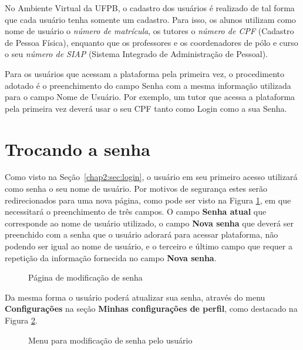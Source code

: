 No Ambiente Virtual da UFPB, o cadastro dos usuários é realizado de tal forma que cada usuário tenha somente 
um cadastro. Para isso, os alunos utilizam como nome de usuário o \emph{número de matrícula}, os tutores o \emph{número de CPF} (Cadastro de Pessoa Física), enquanto que os professores e os coordenadores de pólo e curso o seu \emph{número de SIAP} (Sistema Integrado de Administração de Pessoal).

Para os usuários que acessam a plataforma pela primeira vez, o procedimento adotado é o preenchimento do campo Senha com a mesma informação utilizada para o campo Nome de Usuário. Por exemplo, um tutor que acessa a plataforma pela primeira vez deverá 
usar o seu CPF tanto como Login como a sua Senha.
\section{Trocando a senha}
\label{chap2:sec:trocando}
Como visto na Seção~\ref{chap2:sec:login}, o usuário em seu primeiro acesso utilizará como senha o seu nome de usuário. Por motivos de segurança estes serão redirecionados para uma nova página, como pode ser visto na Figura \ref{fig:modifica senha}, em que necessitará o preenchimento de três campos. O campo \textbf{Senha atual} que corresponde ao nome de usuário utilizado, o campo \textbf{Nova senha} que deverá ser preenchido com a senha que o usuário adorará para acessar plataforma, não podendo ser igual ao nome de usuário, e o terceiro e último campo que requer a repetição da informação fornecida no campo \textbf{Nova senha}.

\begin{figure}[htbp]
 \begin{center}
  \caption{Página de modificação de senha}
  \label{fig:modifica senha}
 \end{center}
\end{figure}

Da mesma forma o usuário poderá atualizar sua senha, através do menu \textbf{Configurações} na seção \textbf{Minhas configurações de perfil}, como destacado na Figura \ref{fig:menu senha}.

\begin{figure}[htbp]
 \begin{center}
  \caption{Menu para modificação de senha pelo usuário}
  \label{fig:menu senha}
 \end{center}
\end{figure}

